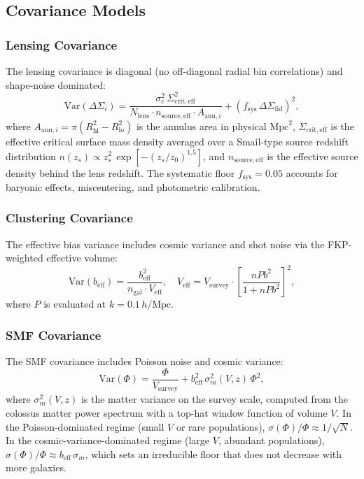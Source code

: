 \documentclass[12pt, letterpaper]{article}
\newcommand{\DS}{\Delta\Sigma}
\newcommand{\beff}{b_\mathrm{eff}}
\newcommand{\ngal}{n_\mathrm{gal}}
\begin{document}
\subsection{Covariance Models}

\subsubsection{Lensing Covariance}

The lensing covariance is diagonal (no off-diagonal radial bin
correlations) and shape-noise dominated:
\begin{equation}
\mathrm{Var}(\DS_i) = \frac{\sigma_e^2 \,\Sigma_\mathrm{crit,eff}^2}
    {N_\mathrm{lens} \cdot n_\mathrm{source,eff} \cdot A_{\mathrm{ann},i}}
    + \left(f_\mathrm{sys}\,\DS_\mathrm{fid}\right)^2,
\label{eq:var_ds}
\end{equation}
where $A_{\mathrm{ann},i} = \pi(R_\mathrm{hi}^2 - R_\mathrm{lo}^2)$
is the annulus area in physical $\mathrm{Mpc}^2$,
$\Sigma_\mathrm{crit,eff}$ is the effective critical surface mass
density averaged over a Smail-type source redshift distribution
$n(z_s) \propto z_s^2\,\exp[-(z_s/z_0)^{1.5}]$, and
$n_\mathrm{source,eff}$ is the effective source density behind the
lens redshift.
The systematic floor $f_\mathrm{sys} = 0.05$ accounts for baryonic
effects, miscentering, and photometric calibration.


\subsubsection{Clustering Covariance}

The effective bias variance includes cosmic variance and shot noise
via the FKP-weighted effective volume:
\begin{equation}
\mathrm{Var}(\beff) = \frac{\beff^2}
    {\ngal \cdot V_\mathrm{eff}},
\quad
V_\mathrm{eff} = V_\mathrm{survey} \cdot
    \left[\frac{nPb^2}{1 + nPb^2}\right]^2,
\end{equation}
where $P$ is evaluated at $k = 0.1\,h/\mathrm{Mpc}$.


\subsubsection{SMF Covariance}

The SMF covariance includes Poisson noise and cosmic variance:
\begin{equation}
\mathrm{Var}(\Phi) = \frac{\Phi}{V_\mathrm{survey}}
    + \beff^2\,\sigma_m^2(V, z)\,\Phi^2,
\label{eq:var_smf}
\end{equation}
where $\sigma_m^2(V, z)$ is the matter variance on the survey scale,
computed from the colossus matter power spectrum with a top-hat window
function of volume $V$.
In the Poisson-dominated regime (small $V$ or rare populations),
$\sigma(\Phi)/\Phi \approx 1/\sqrt{N}$.
In the cosmic-variance-dominated regime (large $V$, abundant
populations), $\sigma(\Phi)/\Phi \approx \beff\,\sigma_m$, which
sets an irreducible floor that does not decrease with more galaxies.
\end{document}
